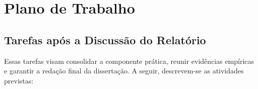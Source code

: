 
%

\chapter{Plano de Trabalho}
\label{cha:work_plan}

\glsresetall
{}

\section{Tarefas após a Discussão do Relatório}
\label{sec:tasks_after_discussion}

Essas tarefas visam consolidar a componente prática, reunir evidências
empíricas e garantir a redação final da dissertação. A seguir,
descrevem-se as atividades previstas:

